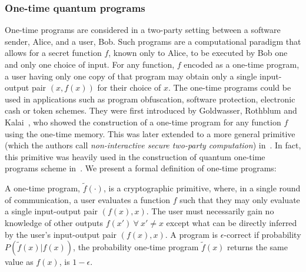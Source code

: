 \subsubsection{One-time quantum programs} 
One-time programs are considered in a two-party setting between a software sender, Alice, and a user, Bob. Such programs are a computational paradigm that allows for a secret function $f$, known only to Alice, to be executed by Bob one and only one choice of input. For any function, $f$ encoded as a one-time program, a user having only one copy of that program may obtain only a single input-output pair $(x, f(x))$ for their choice of $x$.  The one-time programs could be used in applications such as program obfuscation, software protection, electronic cash or token schemes. They were first introduced by Goldwasser, Rothblum and Kalai~\cite{goldwasser2008one}, who showed the construction of a one-time program for any function $f$ using the one-time memory. This was later extended to a more general primitive (which the authors call \emph{non-interactive secure two-party computation}) in~\cite{goyal2010founding}. In fact, this primitive was heavily used in the construction of quantum one-time programs scheme in~\cite{broadbent2013quantum}. We present a formal definition of one-time programs: 

 \begin{definition}
A one-time program, $\tilde{f}(\cdot)$, is a cryptographic primitive, where, in a single round of communication, a user evaluates a function $f$ such that they may only evaluate a single input-output pair $(f(x),x)$. The user must necessarily gain no knowledge of other outputs $f(x') ~\forall~  x' \neq x$ except what can be directly inferred by the user's input-output pair $(f(x),x)$. A program is $\epsilon$-correct if probability $P(\tilde{f}(x)|f(x))$, the probability one-time program $\tilde{f}(x)$ returns the same value as $f(x)$, is $1-\epsilon$.  
\end{definition}


